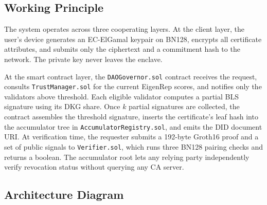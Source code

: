 \documentclass[12pt,a4paper]{article}
\begin{document}
\subsection*{Working Principle}

The system operates across three cooperating layers. At the client layer, the user's device generates an EC-ElGamal keypair on BN128, encrypts all certificate attributes, and submits only the ciphertext and a commitment hash to the network. The private key never leaves the enclave.

At the smart contract layer, the \texttt{DAOGovernor.sol} contract receives the request, consults \texttt{TrustManager.sol} for the current EigenRep scores, and notifies only the validators above threshold. Each eligible validator computes a partial BLS signature using its DKG share. Once $k$ partial signatures are collected, the contract assembles the threshold signature, inserts the certificate's leaf hash into the accumulator tree in \texttt{AccumulatorRegistry.sol}, and emits the DID document URI. At verification time, the requester submits a 192-byte Groth16 proof and a set of public signals to \texttt{Verifier.sol}, which runs three BN128 pairing checks and returns a boolean. The accumulator root lets any relying party independently verify revocation status without querying any CA server.

\subsection*{Architecture Diagram}
\end{document}
